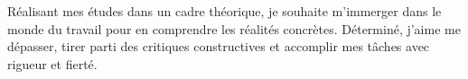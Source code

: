 \documentclass[10pt,a4paper,ragged2e,withhyper]{altacv}
\begin{document}
\begin{paracol}{2}

{\LaTeXraggedright
{}
\par}

\divider\smallskip







\vspace{-1em} %

\justify
Réalisant mes études dans un cadre théorique, je souhaite m'immerger dans le monde du travail pour en comprendre les réalités concrètes. Déterminé, j'aime me dépasser, tirer parti des critiques constructives et accomplir mes tâches avec rigueur et fierté.




\end{paracol}
\end{document}
